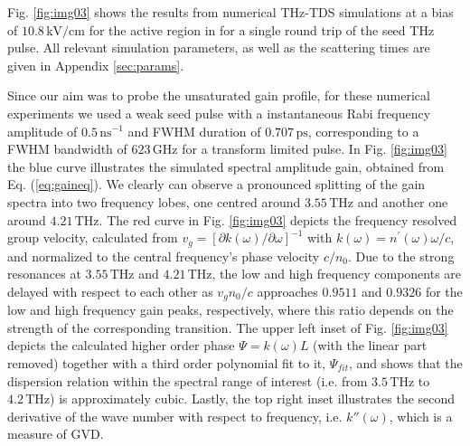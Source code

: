 \documentclass[10pt,letterpaper]{article}%
\begin{document}
Fig. \ref{fig:img03} shows the results from numerical THz-TDS simulations at a
bias of $10.8{\,}\mathrm{kV/cm}$ for the active region in
\cite{burghoff2014terahertz} for a single round trip of the seed THz
pulse\textrm{.} All relevant simulation parameters, as well as the scattering
times are given in Appendix \ref{sec:params}.

Since our aim was to probe the unsaturated gain profile, for these numerical
experiments we used a weak seed pulse with a instantaneous Rabi frequency
amplitude of $0.5{\,}\mathrm{ns}^{-1}$ and FWHM duration of $0.707{\,}%
\mathrm{ps}$, corresponding to a FWHM bandwidth of $623{\,}\mathrm{GHz}$ for a
transform limited pulse. In Fig. \ref{fig:img03} the blue curve illustrates
the simulated spectral amplitude gain, obtained from Eq. (\ref{eq:gaineq}). We
clearly can observe a pronounced splitting of the gain spectra into two
frequency lobes, one centred around $3.55{\,}\mathrm{THz}$ and another one
around $4.21{\,}\mathrm{THz}$. The red curve in Fig. \ref{fig:img03} depicts
the frequency resolved group velocity, calculated from $v_{g}=[\partial
k(\omega)/\partial\omega]^{-1}$ with $k(\omega)=n^{\prime}(\omega)\omega/c$,
and normalized to the central frequency's phase velocity $c/n_{0}$.
Due to the strong resonances at $3.55{\,}\mathrm{THz}$ and $4.21{\,}%
\mathrm{THz}$, the low and high frequency components are delayed
with respect to each other as $v_{g}n_{0}/c$ approaches $0.9511$ and $0.9326$
for the low and high frequency gain peaks, respectively, where this ratio
depends on the strength of the corresponding transition. The upper left inset
of Fig. \ref{fig:img03} depicts the calculated higher order phase
$\Psi=k(\omega)L$ (with the linear part removed) together with a third order
polynomial fit to it, $\Psi_{fit}$, and shows that the dispersion relation
within the spectral range of interest (i.e. from $3.5{\,}\mathrm{THz}$ to
$4.2{\,}\mathrm{THz}$) is approximately cubic. Lastly, the top right inset
illustrates the second derivative of the wave number with respect to
frequency, i.e. $k''(\omega)$, which is a measure of GVD.
\end{document}
